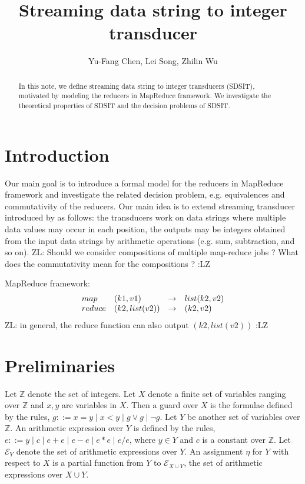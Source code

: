 \documentclass[11pt]{article}
\title{Streaming data string to integer transducer}
\author{Yu-Fang Chen, Lei Song, Zhilin Wu}
\def\Ee{{\mathcal{E} }}
\def\Ii{{\mathbb{Z} }}
\newcommand{\zhilin}[1]{\color{cyan} {ZL: #1 :LZ} \color{black}}
\begin{document}
\maketitle

\begin{abstract}
In this note, we define streaming data string to integer transducers (SDSIT), motivated by modeling the reducers in MapReduce framework. We investigate the theoretical properties of SDSIT and the decision problems of SDSIT. 
\end{abstract}

\section{Introduction}

Our main goal is to introduce a formal model for the reducers in MapReduce framework and investigate the related decision problem, e.g. equivalences and commutativity of the reducers. Our main idea is to extend streaming transducer introduced by \cite{RP11} as follows: the transducers work on data strings where multiple data values may occur in each position, the outputs may be integers obtained from the input data strings by arithmetic operations (e.g. sum, subtraction, and so on). \zhilin{Should we consider compositions of multiple map-reduce jobs ? What does the commutativity mean for the compositions ?} 

MapReduce framework:
\[
\begin{array}{l l c l} 
map & (k1,v1) & \rightarrow & list(k2,v2)\\
reduce & (k2,list(v2)) & \rightarrow & (k2,v2) 
\end{array}
\]
\zhilin{in general, the reduce function can also output $(k2, list(v2))$}

\section{Preliminaries}

Let $\Ii$ denote the set of integers. Let $X$ denote a finite set of variables ranging over $\Ii$ and $x,y$ are variables in $X$. Then a guard over $X$ is the formulae defined by the rules, $g::= x = y \mid x < y \mid g \vee g \mid \neg g$. Let $Y$ be another set of variables over $\Ii$. An arithmetic expression over $Y$ is defined by the rules, $e::= y \mid c \mid e + e \mid e-e \mid e * e \mid e / e$, where $y \in Y$ and $c$ is a constant over $\Ii$. Let $\Ee_Y$ denote the set of arithmetic expressions over $Y$. An assignment $\eta$ for $Y$ with respect to $X$ is a partial function from $Y$ to $\Ee_{X \cup Y}$, the set of arithmetic expressions over $X \cup Y$.
\end{document}
